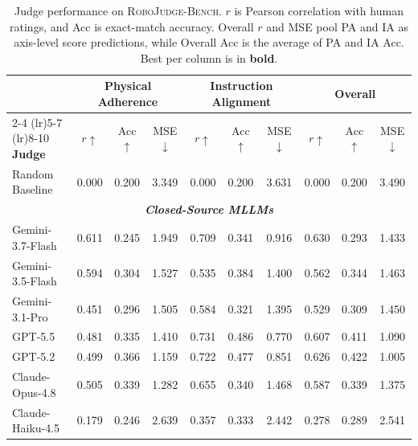 \begin{table}[t]
\setlength{\belowcaptionskip}{2pt}
\centering
\caption{Judge performance on \textsc{RoboJudge-Bench}. $r$ is Pearson correlation with human ratings, and Acc is exact-match accuracy. Overall $r$ and MSE pool PA and IA as axis-level score predictions, while Overall Acc is the average of PA and IA Acc. Best per column is in \textbf{bold}.}
\label{tab:judge_performance}
\fontsize{7.2pt}{9pt}\selectfont
\setlength{\tabcolsep}{3pt}
\begin{tabular}{@{}l ccc ccc cc c@{}}
\hline
 & \multicolumn{3}{c}{\textbf{Physical Adherence}} & \multicolumn{3}{c}{\textbf{Instruction Alignment}} & \multicolumn{3}{c}{\textbf{Overall}} \\
\cmidrule(lr){2-4} \cmidrule(lr){5-7} \cmidrule(lr){8-10}
\textbf{Judge} & $r\uparrow$ & Acc$\uparrow$ & MSE$\downarrow$ & $r\uparrow$ & Acc$\uparrow$ & MSE$\downarrow$ & $r\uparrow$ & Acc$\uparrow$ & MSE$\downarrow$ \\

\midrule
Random Baseline
& 0.000 & 0.200 & 3.349
& 0.000 & 0.200 & 3.631
& 0.000 & 0.200 & 3.490 \\
\midrule
\multicolumn{10}{c}{\textit{\textbf{Closed-Source MLLMs}}}\\
\midrule
Gemini-3.7-Flash~\citep{google2026gemini37flash}
& 0.611 & 0.245 & 1.949
& 0.709 & 0.341 & 0.916
& 0.630 & 0.293 & 1.433 \\

Gemini-3.5-Flash~\citep{google2026gemini35flash}
& 0.594 & 0.304 & 1.527
& 0.535 & 0.384 & 1.400
& 0.562 & 0.344 & 1.463 \\

Gemini-3.1-Pro~\citep{google2026gemini31pro}
& 0.451 & 0.296 & 1.505
& 0.584 & 0.321 & 1.395
& 0.529 & 0.309 & 1.450 \\

GPT-5.5~\citep{openai2026gpt55}
& 0.481 & 0.335 & 1.410
& 0.731 & 0.486 & 0.770
& 0.607 & 0.411 & 1.090 \\

GPT-5.2~\citep{openai2025gpt52}
& 0.499 & 0.366 & 1.159
& 0.722 & 0.477 & 0.851
& 0.626 & 0.422 & 1.005 \\

Claude-Opus-4.8~\citep{anthropic2026claudeopus48}
& 0.505 & 0.339 & 1.282
& 0.655 & 0.340 & 1.468
& 0.587 & 0.339 & 1.375 \\

Claude-Haiku-4.5~\citep{anthropic2025claudehaiku45}
& 0.179 & 0.246 & 2.639
& 0.357 & 0.333 & 2.442
& 0.278 & 0.289 & 2.541 \\


\end{tabular}
\end{table}
